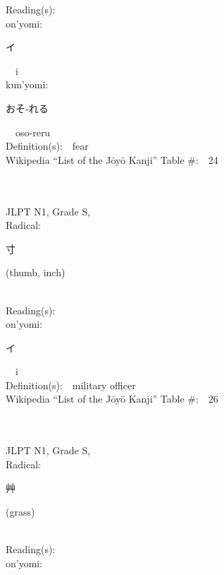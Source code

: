 \begin{multicols}{2}
Reading(s):\ \ \\
{\hspace*{1em}}on'yomi:\ \ \\
{\hspace*{2em}}{\begin{CJK}{UTF8}{min} イ \end{CJK}}\ \ i\ \ \\
{\hspace*{1em}}kun'yomi:\ \ \\
{\hspace*{2em}}{\begin{CJK}{UTF8}{min} おそ-れる \end{CJK}}\ \ oso-reru\ \ \\
Definition(s):\ \ fear \\
Wikipedia ``List of the J\=oy\=o Kanji'' Table \#:\ \ 24 \\
\ \ \\
{\fontsize{34pt}{40pt}  }\ \ \\
{JLPT N1, Grade S, \\Radical:\ \ {\begin{CJK}{UTF8}{min} 寸 \end{CJK}} (thumb, inch) } \\
Reading(s):\ \ \\
{\hspace*{1em}}on'yomi:\ \ \\
{\hspace*{2em}}{\begin{CJK}{UTF8}{min} イ \end{CJK}}\ \ i\ \ \\
Definition(s):\ \ military officer \\
Wikipedia ``List of the J\=oy\=o Kanji'' Table \#:\ \ 26 \\
\ \ \\
{\fontsize{34pt}{40pt}  }\ \ \\
{JLPT N1, Grade S, \\Radical:\ \ {\begin{CJK}{UTF8}{min} 艸 \end{CJK}} (grass) } \\
Reading(s):\ \ \\
{\hspace*{1em}}on'yomi:\ \ \\

\end{multicols}
